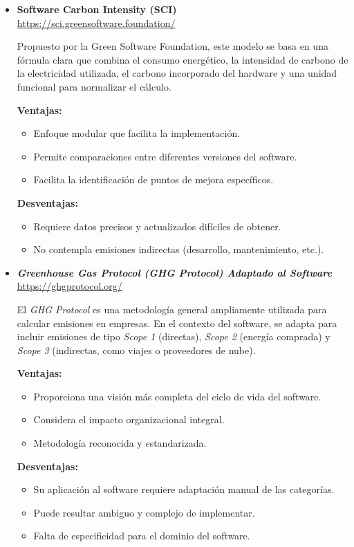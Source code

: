 \documentclass[12pt,a4paper]{report}
\begin{document}
\begin{itemize}
  \item \textbf{Software Carbon Intensity (SCI)} \\
        \href{https://sci.greensoftware.foundation/}{https://sci.greensoftware.foundation/}

        Propuesto por la Green Software Foundation, este modelo se basa en una fórmula clara que combina el consumo energético, la intensidad de carbono de la electricidad utilizada, el carbono incorporado del hardware y una unidad funcional para normalizar el cálculo.

        \textbf{Ventajas:}
        \begin{itemize}
          \item Enfoque modular que facilita la implementación.
          \item Permite comparaciones entre diferentes versiones del software.
          \item Facilita la identificación de puntos de mejora específicos.
        \end{itemize}
        \textbf{Desventajas:}
        \begin{itemize}
          \item Requiere datos precisos y actualizados difíciles de obtener.
          \item No contempla emisiones indirectas (desarrollo, mantenimiento, etc.).
        \end{itemize}

        \vspace{0.8em}

  \item \textit{\textbf{Greenhouse Gas Protocol (GHG Protocol) Adaptado al Software}} \\
        \href{https://ghgprotocol.org/}{https://ghgprotocol.org/}

        El \textit{GHG Protocol} es una metodología general ampliamente utilizada para calcular emisiones en empresas. En el contexto del software, se adapta para incluir emisiones de tipo \textit{Scope 1} (directas), \textit{Scope 2} (energía comprada) y \textit{Scope 3} (indirectas, como viajes o proveedores de nube).

        \textbf{Ventajas:}
        \begin{itemize}
          \item Proporciona una visión más completa del ciclo de vida del software.
          \item Considera el impacto organizacional integral.
          \item Metodología reconocida y estandarizada.
        \end{itemize}
        \textbf{Desventajas:}
        \begin{itemize}
          \item Su aplicación al software requiere adaptación manual de las categorías.
          \item Puede resultar ambiguo y complejo de implementar.
          \item Falta de especificidad para el dominio del software.
        \end{itemize}


\end{itemize}
\end{document}
